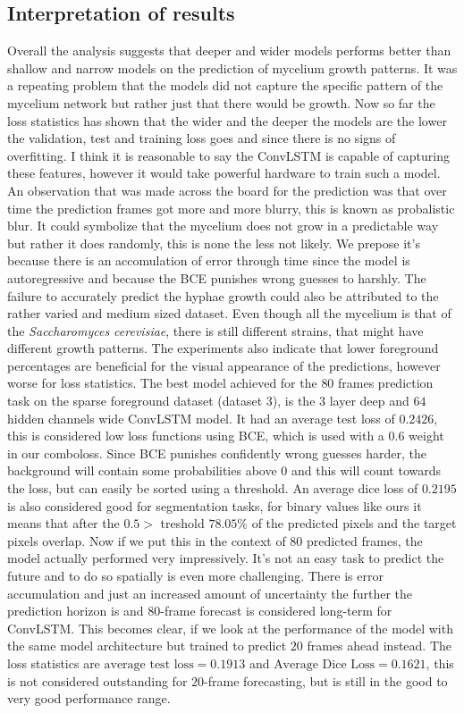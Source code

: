 \documentclass[a4paper,12pt]{article}
\begin{document}
\subsection{Interpretation of results}
Overall the analysis suggests that deeper and wider models performs better than shallow and narrow models on the prediction of mycelium growth patterns. It was a repeating problem that the models did not capture the specific pattern of the mycelium network but rather just that there would be growth. Now so far the loss statistics has shown that the wider and the deeper the models are the lower the validation, test and training loss goes and since there is no signs of overfitting. I think it is reasonable to say the ConvLSTM is capable of capturing these features, however it would take powerful hardware to train such a model. 
An observation that was made across the board for the prediction was that over time the prediction frames got more and more blurry, this is known as probalistic blur. It could symbolize that the mycelium does not grow in a predictable way but rather it does randomly, this is none the less not likely. We prepose it's because there is an accomulation of error through time since the model is autoregressive and because the BCE punishes wrong guesses to harshly. The failure to accurately predict the hyphae growth could also be attributed to the rather varied and medium sized dataset. 
Even though all the mycelium is that of the \textit{Saccharomyces cerevisiae}, there is still different strains, that might have different growth patterns.
The experiments also indicate that lower foreground percentages are beneficial for the visual appearance of the predictions, however worse for loss statistics.
The best model achieved for the $80$ frames prediction task on the sparse foreground dataset (dataset 3), is the $3$ layer deep and $64$ hidden channels wide ConvLSTM model. It had an average test loss of $0.2426$, this is considered low loss functions using BCE, which is used with a $0.6$ weight in our comboloss. Since BCE punishes confidently wrong guesses harder, the background will contain some probabilities above $0$ and this will count towards the loss, but can easily be sorted using a threshold. An average dice loss of $0.2195$ is also considered good for segmentation tasks, for binary values like ours it means that after the $0.5>$ treshold $78.05\%$ of the predicted pixels and the target pixels overlap. 
Now if we put this in the context of $80$ predicted frames, the model actually performed very impressively. It's not an easy task to predict the future and to do so spatially is even more challenging. There is error accumulation and just an increased amount of uncertainty the further the prediction horizon is and $80$-frame forecast is considered long-term for ConvLSTM.
This becomes clear, if we look at the performance of the model with the same model architecture but trained to predict $20$ frames ahead instead. The loss statistics are $\text{average test loss} = 0.1913$ and $\text{Average Dice Loss} = 0.1621$, this is not considered outstanding for $20$-frame forecasting, but is still in the good to very good performance range.
\end{document}
